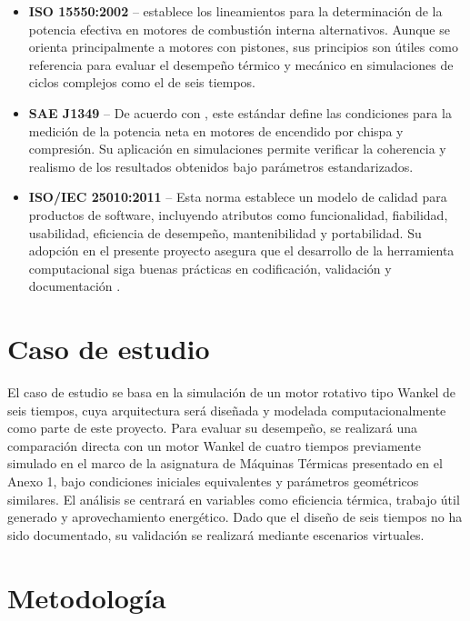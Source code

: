 \documentclass{LS}
\begin{document}
\begin{itemize}
    \item \textbf{ISO 15550:2002} – \cite{iso15550} establece los lineamientos para la determinación de la potencia efectiva en motores de combustión interna alternativos. Aunque se orienta principalmente a motores con pistones, sus principios son útiles como referencia para evaluar el desempeño térmico y mecánico en simulaciones de ciclos complejos como el de seis tiempos.

    \item \textbf{SAE J1349} – De acuerdo con \cite{saeJ1349}, este estándar define las condiciones para la medición de la potencia neta en motores de encendido por chispa y compresión. Su aplicación en simulaciones permite verificar la coherencia y realismo de los resultados obtenidos bajo parámetros estandarizados.

    \item \textbf{ISO/IEC 25010:2011} – Esta norma establece un modelo de calidad para productos de software, incluyendo atributos como funcionalidad, fiabilidad, usabilidad, eficiencia de desempeño, mantenibilidad y portabilidad. Su adopción en el presente proyecto asegura que el desarrollo de la herramienta computacional siga buenas prácticas en codificación, validación y documentación \cite{iso25010}.

\end{itemize}

\section{\bfseries\fontsize{10}{12}\selectfont Caso de estudio  }\label{sec:intro}

El caso de estudio se basa en la simulación de un motor rotativo tipo Wankel de seis tiempos, cuya arquitectura será diseñada y modelada computacionalmente como parte de este proyecto. Para evaluar su desempeño, se realizará una comparación directa con un motor Wankel de cuatro tiempos previamente simulado en el marco de la asignatura de Máquinas Térmicas presentado en el Anexo 1, bajo condiciones iniciales equivalentes y parámetros geométricos similares. El análisis se centrará en variables como eficiencia térmica, trabajo útil generado y aprovechamiento energético. Dado que el diseño de seis tiempos no ha sido documentado, su validación se realizará mediante escenarios virtuales.



\section{\bfseries\fontsize{10}{12}\selectfont Metodología }\label{sec:metodologia}
\end{document}
